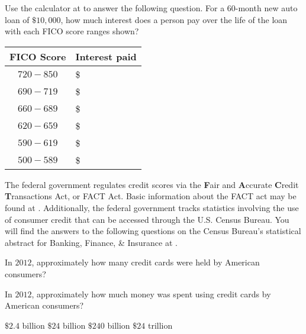 \documentclass{ximera}
\begin{document}
\begin{question}
Use the calculator at  to answer the following question. For a 60-month new auto loan of $\$10,000$, how much interest does a person pay over the life of the loan with each FICO score ranges shown?

\begin{free-response}
\begin{tabular}{@{}cl@{}}\toprule
 \textbf{FICO Score} & \textbf{Interest paid}\\\midrule
$720-850$ & \$\\
$690-719$ & \$\\
$660-689$ & \$\\
$620-659$ & \$\\
$590-619$ & \$\\
$500-589$ & \$\\
\bottomrule
\end{tabular}
\end{free-response}
\end{question}

The federal government regulates credit scores via the \textbf{F}air and \textbf{A}ccurate \textbf{C}redit \textbf{T}ransactions Act, or FACT Act. Basic information about the FACT act may be found at . Additionally, the federal government tracks statistics involving the use of consumer credit that can be accessed through the U.S. Census Bureau. You will find the answers to the following questions on the Census Bureau's statistical abstract for Banking, Finance, \& Insurance at .


\begin{question}
In $2012$, approximately how many credit cards were held by American consumers?
  \begin{solution}
    \begin{multiple-choice}
    \end{multiple-choice}
  \end{solution}
\end{question}

\begin{question}
In $2012$, approximately how much money was spent using credit cards by American consumers?
  \begin{solution}
    \begin{multiple-choice}
    	\choice $\$2.4$ billion
        \choice $\$24$ billion
        \choice $\$240$ billion
        \choice $\$24$ trillion
    \end{multiple-choice}
  \end{solution}
\end{question}
\end{document}
